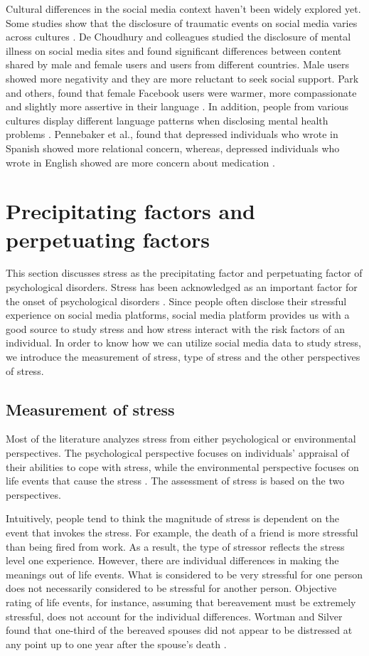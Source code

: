 Cultural differences in the social media context haven't been widely explored yet. Some studies show that the disclosure of traumatic events on social media varies across cultures \cite{freitag2011talking,de2016quantifying}. De Choudhury and colleagues studied the disclosure of mental illness on social media sites and found significant differences between content shared by male and female users and users from different countries. Male users showed more negativity and they are more reluctant to seek social support.  Park and others, found that female Facebook users were warmer, more compassionate and slightly more assertive in their language \cite{park_women_2016}. In addition, people from various cultures display different language patterns when disclosing mental health problems \cite{de_choudhury_gender_2017}. Pennebaker et al., found that depressed individuals who wrote in Spanish showed more relational concern, whereas, depressed individuals who wrote in English showed are more concern about medication \cite{ramirez2008psychology}.

\section{Precipitating factors and perpetuating factors}
This section discusses stress as the precipitating factor and perpetuating factor of psychological disorders. Stress has been acknowledged as an important factor for the onset of psychological disorders \cite{langner1963life}. Since people often disclose their stressful experience on social media platforms, social media platform provides us with a good source to study stress and how stress interact with the risk factors of an individual. In order to know how we can utilize social media data to study stress, we introduce the measurement of stress, type of stress and the other perspectives of stress.

\subsection{Measurement of stress}
Most of the literature analyzes stress from either psychological or environmental perspectives. The psychological perspective focuses on individuals' appraisal of their abilities to cope with stress, while the environmental perspective focuses on life events that cause the stress \cite{mcgrath1970social}. The assessment of stress is based on the two perspectives.

Intuitively, people tend to think the magnitude of stress is dependent on the event that invokes the stress. For example, the death of a friend is more stressful than being fired from work. As a result, the type of stressor reflects the stress level one experience. However, there are individual differences in making the meanings out of life events. What is considered to be very stressful for one person does not necessarily considered to be stressful for another person. Objective rating of life events, for instance, assuming that bereavement must be extremely stressful, does not account for the individual differences.  Wortman and Silver found that one-third of the bereaved spouses did not appear to be distressed at any point up to one year after the spouse's death \cite{wortman1989myths}. 

